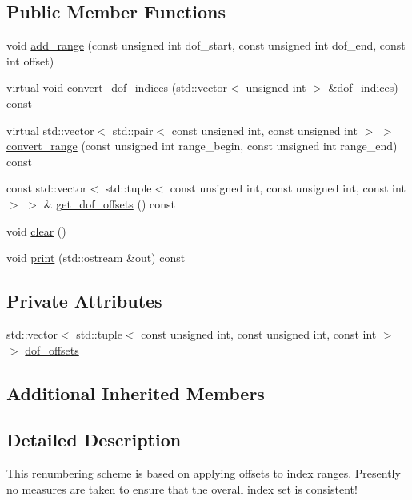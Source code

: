 \subsection*{Public Member Functions}
\begin{DoxyCompactItemize}
\item 
void \hyperlink{class_do_f_renumbering_offset_a39333b4c3597c2b4a967f7af3cec0054}{add\+\_\+range} (const unsigned int dof\+\_\+start, const unsigned int dof\+\_\+end, const int offset)
\item 
virtual void \hyperlink{class_do_f_renumbering_offset_a7b48f6f59b90c015b7e176148edbb797}{convert\+\_\+dof\+\_\+indices} (std\+::vector$<$ unsigned int $>$ \&dof\+\_\+indices) const 
\item 
virtual std\+::vector$<$ std\+::pair$<$ const unsigned int, const unsigned int $>$ $>$ \hyperlink{class_do_f_renumbering_offset_ac066233b202f7982d29206c1221c1f6a}{convert\+\_\+range} (const unsigned int range\+\_\+begin, const unsigned int range\+\_\+end) const 
\item 
const std\+::vector$<$ std\+::tuple$<$ const unsigned int, const unsigned int, const int $>$ $>$ \& \hyperlink{class_do_f_renumbering_offset_af92a21719157c5fd5e8ae42cf8af87f6}{get\+\_\+dof\+\_\+offsets} () const 
\item 
void \hyperlink{class_do_f_renumbering_offset_ac7156c58d0aa5dcb57fa0fe3ac437453}{clear} ()
\item 
void \hyperlink{class_do_f_renumbering_offset_a51ae1b70be0b0a2444c4bba71a272f71}{print} (std\+::ostream \&out) const 
\end{DoxyCompactItemize}
\subsection*{Private Attributes}
\begin{DoxyCompactItemize}
\item 
std\+::vector$<$ std\+::tuple$<$ const unsigned int, const unsigned int, const int $>$ $>$ \hyperlink{class_do_f_renumbering_offset_a5df6c4b70b1394c3670ced634146c9a9}{dof\+\_\+offsets}
\end{DoxyCompactItemize}
\subsection*{Additional Inherited Members}


\subsection{Detailed Description}
This renumbering scheme is based on applying offsets to index ranges. Presently no measures are taken to ensure that the overall index set is consistent! 


